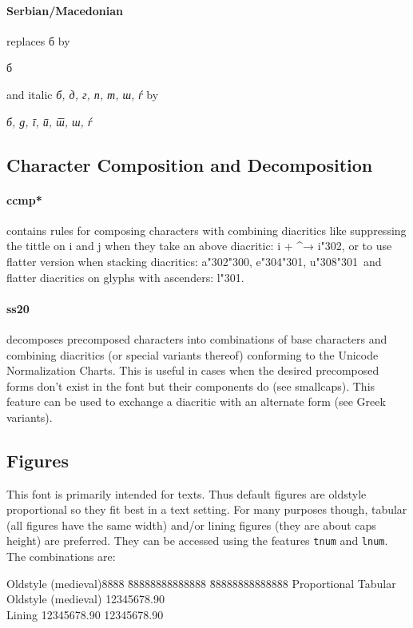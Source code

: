 \documentclass[pagesize,DIV14]{scrartcl}
\begin{document}
\paragraph*{Serbian/Macedonian} replaces б by \begin{serbian}б\end{serbian} and italic \textit{б, д, г, п, т, ш, ѓ} by \begin{serbian}\itshape б, д, г, п, т, ш, ѓ\end{serbian}

\subsection{Character Composition and Decomposition}
\paragraph*{ccmp*} contains rules for composing characters with combining diacritics like suppressing the tittle on i and j when they take an above diacritic: i + \textasciicircum → i\char"302, or to use flatter version when stacking diacritics: a\char"302\char"300, e\char"304\char"301, u\char"308\char"301\ and flatter diacritics on glyphs with ascenders: l\char"301.
\paragraph*{ss20} decomposes precomposed characters into combinations of base characters and combining diacritics (or special variants thereof) conforming to the Unicode Normalization Charts. This is useful in cases when the desired precomposed forms don’t exist in the font but their components do (see smallcaps). This feature can be used to exchange a diacritic with an alternate form (see Greek variants).

\subsection{Figures}
This font is primarily intended for texts. Thus default figures are oldstyle proportional so they fit best in a text setting. For many purposes though, tabular (all figures have the same width) and/or lining figures (they are about caps height) are preferred. They can be accessed using the features \texttt{tnum} and \texttt{lnum}.
The combinations are:
\begin{tabbing}
 Oldstyle (medieval)8888 \= 88888888888888  \= 88888888888888 \kill
  \> Proportional \> Tabular \\
 Oldstyle (medieval)  \> {12345678.90} \\
 Lining		\> {12345678.90} \> {12345678.90} \\
\end{tabbing}
\end{document}
